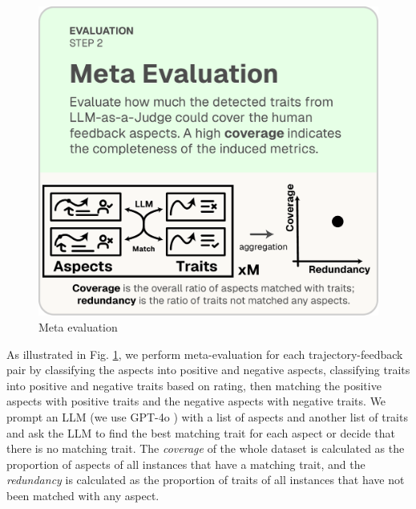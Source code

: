 \begin{figure}
	\vspace{-10pt}
	\includegraphics[width=\linewidth]{figs/autolibra_step_4.pdf}
	\vspace{-10pt}
	\caption{Meta evaluation}
	\label{fig:meta_evaluation}
\end{figure}
As illustrated in Fig. \ref{fig:meta_evaluation}, we perform meta-evaluation for
each trajectory-feedback pair by classifying the aspects into positive and negative
aspects, classifying traits into positive and negative traits based on rating, then
matching the positive aspects with positive traits and the negative aspects with
negative traits. We prompt an LLM (we use GPT-4o \citep{openai2024gpt4ocard}) with
a list of aspects and another list of traits and ask the LLM to find the best matching
trait for each aspect or decide that there is no matching trait. The \emph{coverage}
of the whole dataset is calculated as the proportion of aspects of all instances
that have a matching trait, and the \emph{redundancy} is calculated as the proportion
of traits of all instances that have not been matched with any aspect.


